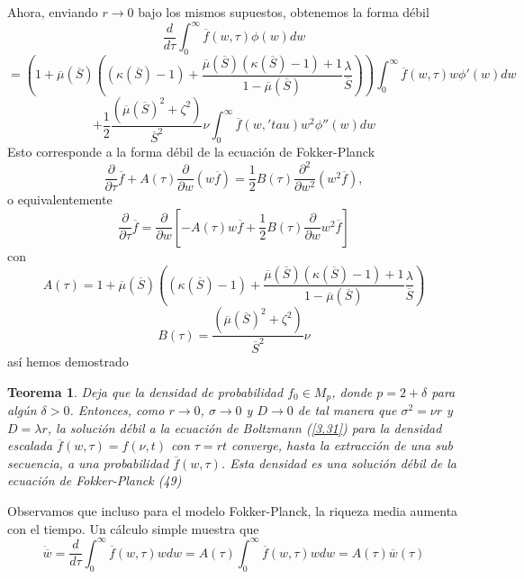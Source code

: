 \documentclass[12pt,a4paper]{article}
\begin{document}
Ahora, enviando $r\rightarrow 0$ bajo los mismos supuestos, obtenemos la forma débil
$$
\frac{d}{d\tau} \int^{\infty}_{0}\overline{f}(w,\tau)\phi(w)dw
$$
$$
=\left(1+\overline{\mu}(\overline{S})\left((\kappa(\overline{S})-1)+\frac{\overline{\mu}(\overline{S})(\kappa (\overline{S})-1)+1}{1-\overline{\mu}(\overline{S})}\frac{\lambda}{\overline{S}}\right)\right) \int^{\infty}_{0}\overline{f}(w,\tau)w\phi' (w)dw
$$
$$
+\frac{1}{2}\frac{(\overline{\mu}(\overline{S})^{2}+ \zeta^{2})}{\overline{S}^2}\nu \int^{\infty}_{0}\overline{f}(w,'tau)w^{2}\phi''(w) dw
$$
Esto corresponde a la forma débil de la ecuación de Fokker-Planck
$$
\frac{\partial}{\partial \tau}\overline{f}+A(\tau)\frac{\partial}{\partial w}(w\overline{f})=\frac{1}{2}B(\tau)\frac{\partial^2}{\partial w^2}(w^2\overline{f}),
$$
o equivalentemente
\begin{equation}
\frac{\partial}{\partial \tau}\overline{f}=\frac{\partial}{\partial w}\left[-A(\tau)w\overline{f}+\frac{1}{2}B(\tau)\frac{\partial}{\partial w}w^2\overline{f}\right]\label{3.49}
\end{equation}
con
\begin{equation}
A(\tau)=1+\overline{\mu}(\overline{S})\left((\kappa(\overline{S})-1)+\frac{\overline{\mu}(\overline{S})(\kappa (\overline{S})-1)+1}{1-\overline{\mu}(\overline{S})}\frac{\lambda}{\overline{S}}\right)\label{3.50}
\end{equation}
\begin{equation}
B(\tau)= \frac{(\overline{\mu}(\overline{S})^{2}+ \zeta^{2})}{\overline{S}^2}\nu \label{3.51}
\end{equation}
así hemos demostrado
\newtheorem{teo}{Teorema}[section]
\begin{teo}
Deja que la densidad de probabilidad $f_0\in M_p$, donde $p=2+\delta$ para algún $\delta >0$. Entonces, como $r\rightarrow 0$, $\sigma \rightarrow 0$ y $D\rightarrow 0$ de tal manera que $\sigma^{2}=\nu r$ y $D=\lambda r $, la solución débil a la ecuación de Boltzmann (\ref{3.31}) para la densidad escalada $\overline{f}(w,\tau)=f(\nu,t)$ con $\tau = rt$ converge, hasta la extracción de una sub secuencia, a una probabilidad $\overline{f}(w,\tau)$. Esta densidad es una solución débil de la ecuación de Fokker-Planck (49)
\end{teo}
\quad Observamos que incluso para el modelo Fokker-Planck, la riqueza media aumenta con el tiempo. Un cálculo simple muestra que
\begin{equation}
\dot{\overline{w}}=\frac{d}{d\tau}\int^{\infty}_{0}\overline{f}(w,\tau) w dw = A(\tau)\int^{\infty}_{0} \overline{f}(w,\tau) wdw = A(\tau)\overline{w}(\tau)\label{3.52}
\end{equation}
\end{document}
